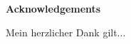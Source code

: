 \clearemptydoublepage
{}
\vspace*{2cm}
{\Large \bf Acknowledgements}

\vspace{1cm}

Mein herzlicher Dank gilt...
